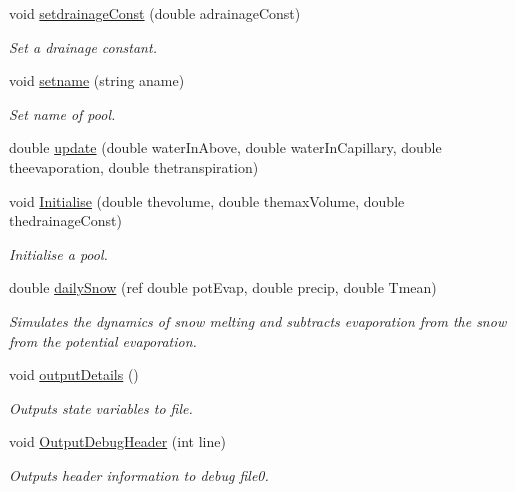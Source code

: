 \begin{DoxyCompactItemize}
void \mbox{\hyperlink{classsimplesoil_model_1_1pool_abcfebe450f6322fd8ece80e88026eb3b}{setdrainage\+Const}} (double adrainage\+Const)
\begin{DoxyCompactList}\small\item\em Set a drainage constant. \end{DoxyCompactList}\item 
void \mbox{\hyperlink{classsimplesoil_model_1_1pool_a52016de02c5aa32f2fb6927252619494}{setname}} (string aname)
\begin{DoxyCompactList}\small\item\em Set name of pool. \end{DoxyCompactList}\item 
double \mbox{\hyperlink{classsimplesoil_model_1_1pool_a5b7b5a3ce11f8db111e79c4726552001}{update}} (double water\+In\+Above, double water\+In\+Capillary, double theevaporation, double thetranspiration)
\item 
void \mbox{\hyperlink{classsimplesoil_model_1_1pool_a926062b473c9a2aa0ffb63cc375afbed}{Initialise}} (double thevolume, double themax\+Volume, double thedrainage\+Const)
\begin{DoxyCompactList}\small\item\em Initialise a pool. \end{DoxyCompactList}\item 
double \mbox{\hyperlink{classsimplesoil_model_1_1pool_aaa4af3081e7de0130231425871a51a85}{daily\+Snow}} (ref double pot\+Evap, double precip, double Tmean)
\begin{DoxyCompactList}\small\item\em Simulates the dynamics of snow melting and subtracts evaporation from the snow from the potential evaporation. \end{DoxyCompactList}\item 
void \mbox{\hyperlink{classsimplesoil_model_1_1pool_a9757328038ba614ff98df009e7c2c7f5}{output\+Details}} ()
\begin{DoxyCompactList}\small\item\em Outputs state variables to file. \end{DoxyCompactList}\item 
void \mbox{\hyperlink{classsimplesoil_model_1_1pool_ae4545ac52a8f85f1d9796a766929e830}{Output\+Debug\+Header}} (int line)
\begin{DoxyCompactList}\small\item\em Outputs header information to debug file0. \end{DoxyCompactList}\item 

\end{DoxyCompactItemize}
